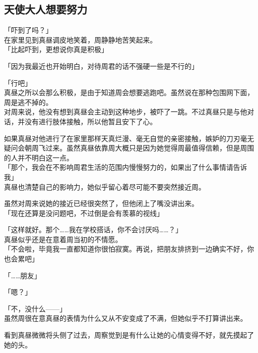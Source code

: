 \subsection{天使大人想要努力}

「吓到了吗？」\\

在家里见到真昼调皮地笑着，周静静地苦笑起来。\\

「比起吓到，更想说你真是积极」

「因为我最近也开始明白，对待周君的话不强硬一些是不行的」

「行吧」\\

真昼之所以会那么积极，是由于知道周会想要逃跑吧。虽然说在那种包围网下面，周是逃不掉的。\\

对周来说，他没有想到真昼会主动到这种地步，被吓了一跳。不过真昼只是与他对话，并没有进行肢体接触，所以他暂且安下了心。

如果真昼对他进行了在家里那样天真烂漫、毫无自觉的亲密接触，嫉妒的刀刃毫无疑问会朝周飞过来。虽然真昼依靠周大概只是因为她觉得周最值得信赖，但是周围的人并不明白这一点。\\

「那个，我会在不影响周君生活的范围内慢慢努力的，如果出了什么事情请告诉我」\\

真昼也清楚自己的影响力，她似乎留心着尽可能不要突然接近周。

虽然对周来说她的接近已经很突然了，但他闭上了嘴没讲出来。\\

「现在还算是没问题吧，不过倒是会有羡慕的视线」

「这样就好。那个……我在学校搭话，你不会讨厌吗……？」\\

真昼似乎还是在意着周当初的不情愿。\\

「不会啦，毕竟我一直都知道你很怕寂寞。再说，把朋友排挤到一边确实不好，你也会累吧」

「……朋友」

「嗯？」

「不，没什么——」\\

虽然周很在意真昼的表情为什么又从不安变成了不满，但她似乎不打算讲出来。

看到真昼微微将头侧了过去，周察觉到是有什么让她的心情变得不好，就先摸起了她的头。\\

